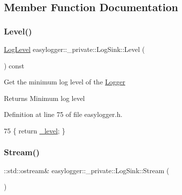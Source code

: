 \subsection{Member Function Documentation}
\mbox{\label{classeasylogger_1_1__private_1_1_log_sink_a00fcf48f0e15153d33f05822f3ca006d}} 
\subsubsection{\texorpdfstring{Level()}{Level()}}
{\footnotesize\ttfamily \mbox{\hyperlink{namespaceeasylogger_a68cb882ead21af982c40e3621fcd50b0}{Log\+Level}} easylogger\+::\+\_\+private\+::\+Log\+Sink\+::\+Level (\begin{DoxyParamCaption}{ }\end{DoxyParamCaption}) const\hspace{0.3cm}{\ttfamily [inline]}}

Get the minimum log level of the \mbox{\hyperlink{classeasylogger_1_1_logger}{Logger}}

\begin{DoxyReturn}{Returns}
Minimum log level 
\end{DoxyReturn}


Definition at line 75 of file easylogger.\+h.


\begin{DoxyCode}
75 \{ \textcolor{keywordflow}{return} \mbox{\hyperlink{classeasylogger_1_1__private_1_1_log_sink_aa95e04bfd9dddc7bb38fcfb9b2033d91}{\_level}}; \}
\end{DoxyCode}
\mbox{\label{classeasylogger_1_1__private_1_1_log_sink_a6d6aa70a384a424a1c566320bf1cdcdf}} 
\subsubsection{\texorpdfstring{Stream()}{Stream()}}
{\footnotesize\ttfamily \+::std\+::ostream\& easylogger\+::\+\_\+private\+::\+Log\+Sink\+::\+Stream (\begin{DoxyParamCaption}{ }\end{DoxyParamCaption})\hspace{0.3cm}{\ttfamily [inline]}}

